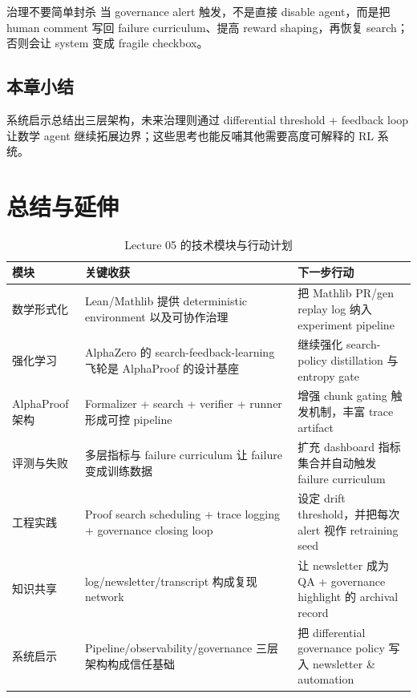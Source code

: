 \documentclass[a4paper]{article}
\begin{document}
\begin{warningbox}{治理不要简单封杀}
当 governance alert 触发，不是直接 disable agent，而是把 human comment 写回 failure curriculum、提高 reward shaping，再恢复 search；否则会让 system 变成 fragile checkbox。
\end{warningbox}

\subsection{本章小结}
系统启示总结出三层架构，未来治理则通过 differential threshold + feedback loop 让数学 agent 继续拓展边界；这些思考也能反哺其他需要高度可解释的 RL 系统。
\newpage

\section{总结与延伸}
\begin{table}[H]
\centering
\begin{tabular}{p{4cm}p{6cm}p{5cm}}
\toprule
模块 & 关键收获 & 下一步行动 \\
\midrule
数学形式化 & Lean/Mathlib 提供 deterministic environment 以及可协作治理 & 把 Mathlib PR/gen replay log 纳入 experiment pipeline \\
强化学习 & AlphaZero 的 search-feedback-learning 飞轮是 AlphaProof 的设计基座 & 继续强化 search-policy distillation 与 entropy gate \\
AlphaProof 架构 & Formalizer + search + verifier + runner 形成可控 pipeline & 增强 chunk gating 触发机制，丰富 trace artifact \\
评测与失败 & 多层指标与 failure curriculum 让 failure 变成训练数据 & 扩充 dashboard 指标集合并自动触发 failure curriculum \\
工程实践 & Proof search scheduling + trace logging + governance closing loop & 设定 drift threshold，并把每次 alert 视作 retraining seed \\
知识共享 & log/newsletter/transcript 构成复现 network & 让 newsletter 成为 QA + governance highlight 的 archival record \\
系统启示 & Pipeline/observability/governance 三层架构构成信任基础 & 把 differential governance policy 写入 newsletter \& automation \\
\bottomrule
\end{tabular}
\caption{Lecture 05 的技术模块与行动计划}
\end{table}
\end{document}
